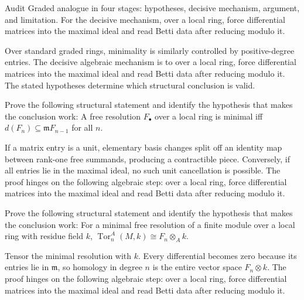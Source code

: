 \begin{problem}\label{prob:v25-problem-08}
Audit Graded analogue in four stages: hypotheses, decisive mechanism, argument, and limitation. For the decisive mechanism, over a local ring, force differential matrices into the maximal ideal and read Betti data after reducing modulo it.
\end{problem}
\begin{solution}
Over standard graded rings, minimality is similarly controlled by positive-degree entries. The decisive algebraic mechanism is to over a local ring, force differential matrices into the maximal ideal and read Betti data after reducing modulo it. The stated hypotheses determine which structural conclusion is valid.
\end{solution}

\begin{problem}\label{prob:v25-problem-09}
Prove the following structural statement and identify the hypothesis that makes the conclusion work: A free resolution $F_\bullet$ over a local ring is minimal iff $d(F_n)\subseteq\mathfrak mF_{n-1}$ for all $n$.
\end{problem}
\begin{solution}
If a matrix entry is a unit, elementary basis changes split off an identity map between rank-one free summands, producing a contractible piece. Conversely, if all entries lie in the maximal ideal, no such unit cancellation is possible. The proof hinges on the following algebraic step: over a local ring, force differential matrices into the maximal ideal and read Betti data after reducing modulo it.
\end{solution}

\begin{problem}\label{prob:v25-problem-10}
Prove the following structural statement and identify the hypothesis that makes the conclusion work: For a minimal free resolution of a finite module over a local ring with residue field $k$, $\operatorname{Tor}_n^A(M,k)\cong F_n\otimes_A k$.
\end{problem}
\begin{solution}
Tensor the minimal resolution with $k$. Every differential becomes zero because its entries lie in $\mathfrak m$, so homology in degree $n$ is the entire vector space $F_n\otimes k$. The proof hinges on the following algebraic step: over a local ring, force differential matrices into the maximal ideal and read Betti data after reducing modulo it.
\end{solution}

